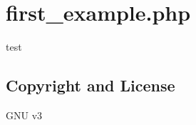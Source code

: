 \hypertarget{first_example_8php-example}{
\section{first\-\_\-example.\-php}
}
test\hypertarget{E:/Programs/EasyPHP-5.3.6/www/HappyCMS/cakephp/app/ReadMe.txt_copyright}{}\subsection{\-Copyright and License}\label{E:/Programs/EasyPHP-5.3.6/www/HappyCMS/cakephp/app/ReadMe.txt_copyright}
\-G\-N\-U v3

\par
\par



\begin{DoxyCodeInclude}
\end{DoxyCodeInclude}
 
